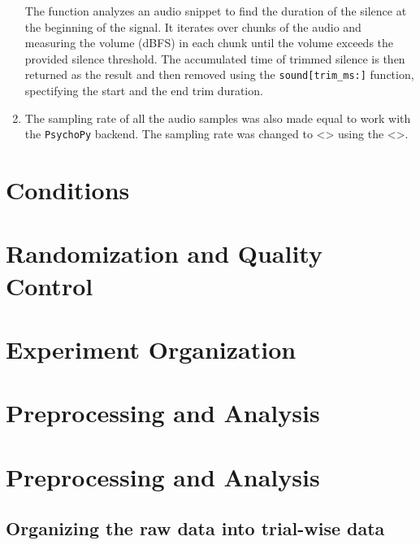 \documentclass[
  a4paper,
]{article}
\begin{document}
\begin{enumerate}
  The function analyzes an audio snippet to find the duration of the
  silence at the beginning of the signal. It iterates over chunks of the
  audio and measuring the volume (dBFS) in each chunk until the volume
  exceeds the provided silence threshold. The accumulated time of
  trimmed silence is then returned as the result and then removed using
  the \texttt{sound{[}trim\_ms:{]}} function, spectifying the start and
  the end trim duration.
\item
  The sampling rate of all the audio samples was also made equal to work
  with the \texttt{PsychoPy} backend. The sampling rate was changed to
  \textless\textgreater{} using the \textless\textgreater.
\end{enumerate}

\hypertarget{conditions}{%
\section{Conditions}\label{conditions}}

\hypertarget{randomization-and-quality-control}{%
\section{Randomization and Quality
Control}\label{randomization-and-quality-control}}

\hypertarget{experiment-organization}{%
\section{Experiment Organization}\label{experiment-organization}}

\hypertarget{preprocessing-and-analysis}{%
\section{Preprocessing and Analysis}\label{preprocessing-and-analysis}}

\hypertarget{preprocessing-and-analysis-1}{%
\section{Preprocessing and
Analysis}\label{preprocessing-and-analysis-1}}

\hypertarget{organizing-the-raw-data-into-trial-wise-data}{%
\subsection{Organizing the raw data into trial-wise
data}\label{organizing-the-raw-data-into-trial-wise-data}}
\end{document}
